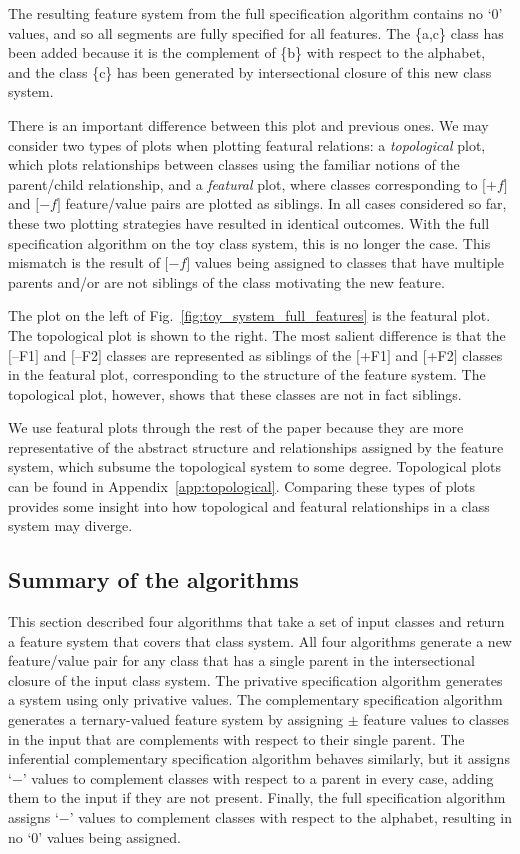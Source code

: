 \documentclass[12pt, oneside]{article}   	%
\newcommand{\featmat}[1]
{$[$#1$]$}
\begin{document}
The resulting feature system from the full specification algorithm contains no `0' values, and so all segments are fully specified for all features. The \{a,c\} class has been added because it is the complement of \{b\} with respect to the alphabet, and the class \{c\} has been generated by intersectional closure of this new class system.

There is an important difference between this plot and previous ones. We may consider two types of plots when plotting featural relations: a \emph{topological} plot, which plots relationships between classes using the familiar notions of the parent/child relationship, and a \emph{featural} plot, where classes corresponding to \featmat{$+f$} and \featmat{$-f$} feature/value pairs are plotted as siblings. In all cases considered so far, these two plotting strategies have resulted in identical outcomes. With the full specification algorithm on the toy class system, this is no longer the case. This mismatch is the result of \featmat{$-f$} values being assigned to classes that have multiple parents and/or are not siblings of the class motivating the new feature.

The plot on the left of Fig.~\ref{fig:toy_system_full_features} is the featural plot. The topological plot is shown to the right. The most salient difference is that the \featmat{--F1} and \featmat{--F2} classes are represented as siblings of the \featmat{+F1} and \featmat{+F2} classes in the featural plot, corresponding to the structure of the feature system. The topological plot, however, shows that these classes are not in fact siblings.

We use featural plots through the rest of the paper because they are more representative of the abstract structure and relationships assigned by the feature system, which subsume the topological system to some degree. Topological plots can be found in Appendix~\ref{app:topological}. Comparing these types of plots provides some insight into how topological and featural relationships in a class system may diverge.

\subsection{Summary of the algorithms}

This section described four algorithms that take a set of input classes and return a feature system that covers that class system. All four algorithms generate a new feature/value pair for any class that has a single parent in the intersectional closure of the input class system. The privative specification algorithm generates a system using only privative values. The complementary specification algorithm generates a ternary-valued feature system by assigning $\pm$ feature values to classes in the input that are complements with respect to their single parent. The inferential complementary specification algorithm behaves similarly, but it assigns `$-$' values to complement classes with respect to a parent in every case, adding them to the input if they are not present. Finally, the full specification algorithm assigns `$-$' values to complement classes with respect to the alphabet, resulting in no `0' values being assigned.
\end{document}
